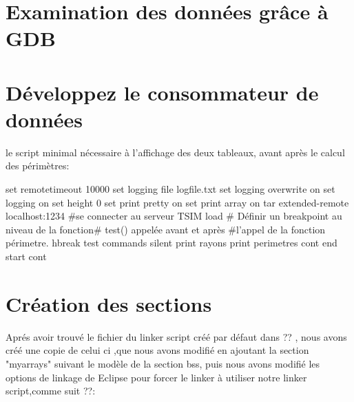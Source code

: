 \documentclass[12pt,a4paper]{article}
\newcommand\tab[1][1cm]{\hspace*{#1}}
\begin{document}
\section{Examination des données grâce à GDB}

\section{Développez le consommateur de données}
le script minimal nécessaire à l'affichage des deux tableaux, avant après le calcul des périmètres:

\begin{framed}
 {\selectfont
 \noindent
set remotetimeout 10000\newline
set logging file logfile.txt\newline
set logging overwrite on\newline
set logging on\newline
set height 0 \newline
set print pretty on \newline
set print array on\newline
tar extended-remote localhost:1234 \#se connecter au serveur TSIM\newline 
load\newline
\# Définir un breakpoint au niveau de la fonction\newline\# test() appelée avant et après \newline
\#l'appel de la fonction périmetre. \newline
\color{red}
hbreak test \newline
\color{black}
commands \newline
\tab silent \newline
\tab 	print rayons\newline
\tab 	print perimetres\newline
\tab cont\newline
end\newline
start \newline
cont\newline

}
  \end{framed}   
\newpage

\section{Création des sections}
Aprés avoir trouvé le fichier du linker script créé par défaut dans ?? , nous avons créé une copie de celui ci ,que nous avons modifié en  ajoutant la section "myarrays" suivant le modèle de la section bss, puis nous avons modifié les options de linkage de Eclipse pour forcer le linker à utiliser notre linker script,comme suit ??:
\end{document}

